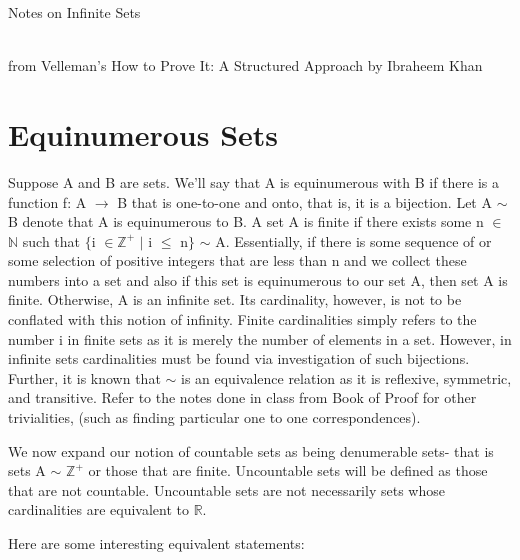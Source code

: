 \documentclass{article}
\begin{document}
\setlength\parindent{24pt}
\begin{center}
\begin{huge}
Notes on Infinite Sets
\end{huge}
\\from Velleman's How to Prove It: A Structured Approach
\newline by Ibraheem Khan
\end{center}

\section{Equinumerous Sets}

\par Suppose A and B are sets. We'll say that A is equinumerous with B if there is a function f: A $\to$ B that is one-to-one and onto, that is, it is a bijection. Let A $\sim$ B denote that A is equinumerous to B. A set A is finite if there exists some n $\in$ $\mathbb{N}$ such that $\{$i $\in \mathbb{Z}^{+}$ $|$ i $\leq$ n$\}$ $\sim$ A. Essentially, if there is some sequence of or some selection of positive integers that are less than n and we collect these numbers into a set and also if this set is equinumerous to our set A, then set A is finite. Otherwise, A is an infinite set. Its cardinality, however, is not to be conflated with this notion of infinity. Finite cardinalities simply refers to the number i in finite sets as it is merely the number of elements in a set. However, in infinite sets cardinalities must be found via investigation of such bijections. Further, it is known that $\sim$ is an equivalence relation as it is reflexive, symmetric, and transitive. Refer to the notes done in class from Book of Proof for other trivialities, (such as finding particular one to one correspondences). 
\\
\par We now expand our notion of countable sets as being denumerable sets- that is sets A $\sim$ $\mathbb{Z}^{+}$ or those that are finite. Uncountable sets will be defined as those that are not countable. Uncountable sets are not necessarily sets whose cardinalities are equivalent to $\mathbb{R}$. 
\\
\par Here are some interesting equivalent statements:
\end{document}
